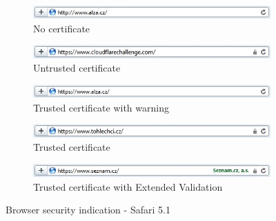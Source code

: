 \begin{figure}
  \begin{subfigure}[b]{\textwidth}
    \centering
    \includegraphics[scale=0.6]{images/browsers/s-none.png}
    \caption{No certificate}
  \end{subfigure}
  \begin{subfigure}[b]{\textwidth}
    \centering
    \includegraphics[scale=0.6]{images/browsers/s-untrusted.png}
    \caption{Untrusted certificate}
  \end{subfigure}
  \begin{subfigure}[b]{\textwidth}
    \centering
    \includegraphics[scale=0.6]{images/browsers/s-warning.png}
    \caption{Trusted certificate with warning}
  \end{subfigure}
  \begin{subfigure}[b]{\textwidth}
    \centering
    \includegraphics[scale=0.6]{images/browsers/s-dv.png}
    \caption{Trusted certificate}
  \end{subfigure}
  \begin{subfigure}[b]{\textwidth}
    \centering
    \includegraphics[scale=0.6]{images/browsers/s-ev.png}
    \caption{Trusted certificate with Extended Validation}
  \end{subfigure}
  \caption{Browser security indication - Safari 5.1}
\end{figure}
